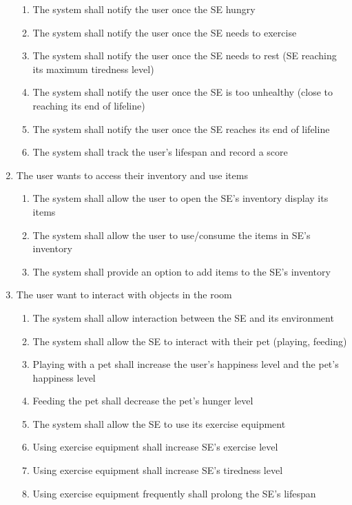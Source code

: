 \documentclass[]{article}
\begin{document}
\begin{enumerate}[start=1, label={\textbf{BE\arabic*.}}]
\begin{enumerate}[1.]
        \item The system shall notify the user once the SE hungry
        \item The system shall notify the user once the SE needs to exercise
        \item The system shall notify the user once the SE needs to rest (SE 
        reaching its maximum tiredness level)
        \item The system shall notify the user once the SE is too unhealthy 
        (close to reaching its end of lifeline)
        \item The system shall notify the user once the SE reaches its end of 
        lifeline
        \item The system shall track the user’s lifespan and record a score
    \end{enumerate}
    
    \item The user wants to access their inventory and use items
	\begin{enumerate}[1.]
        \item The system shall allow the user to open the SE’s inventory display 
        its items
        \item The system shall allow the user to use/consume the items in SE’s 
        inventory
        \item The system shall provide an option to add items to the SE’s 
        inventory        
    \end{enumerate}

    \item The user want to interact with objects in the room
	\begin{enumerate}[1.]
        \item The system shall allow interaction between the SE and its environment
        \item The system shall allow the SE to interact with their pet (playing, 
        feeding)
        \item Playing with a pet shall increase the user’s happiness level and 
        the pet’s  happiness level
        \item Feeding the pet shall decrease the pet’s hunger level
        \item The system shall allow the SE to use its exercise equipment
        \item Using exercise equipment shall increase SE’s exercise level
        \item Using exercise equipment shall increase SE’s tiredness level
        \item Using exercise equipment frequently shall prolong the SE’s lifespan
    \end{enumerate}


\end{enumerate}
\end{document}
